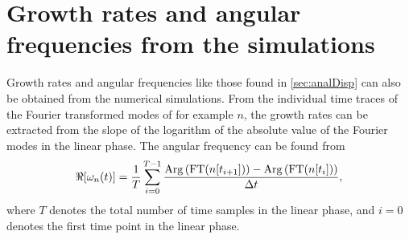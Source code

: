 \section{Growth rates and angular frequencies from the simulations}
\label{sec:grDesc}
%
Growth rates and angular frequencies like those found in \cref{sec:analDisp} can also be obtained from the numerical simulations.
From the individual time traces of the Fourier transformed modes of for example $n$, the growth rates can be extracted from the slope of the logarithm of the absolute value of the Fourier modes in the linear phase.
The angular frequency can be found from
%
\begin{align*}
    \Re[\omega_n(t)] =
    \frac{1}{T}\sum_{i=0}^{T-1}
    \frac{
        \operatorname{Arg}\left(\text{FT}(n[t_{i+1}])\right) -
        \operatorname{Arg}\left(\text{FT}(n[t_{i}])  \right)
    }{\Delta t},
\end{align*}
%
where $T$ denotes the total number of time samples in the linear phase, and $i=0$ denotes the first time point in the linear phase.

